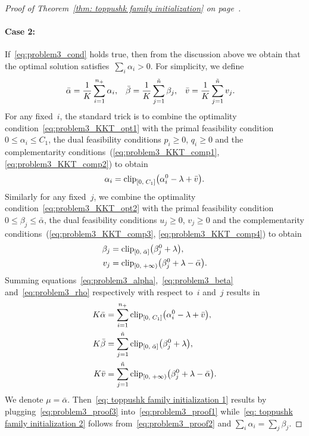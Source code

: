 \begin{proof}[Proof of Theorem~\ref{thm: toppushk family initialization} on page~\pageref{thm: toppushk family initialization}]
  \paragraph*{Case 2:} If~\eqref{eq:problem3_cond} holds true, then from the discussion above we obtain that the optimal solution satisfies~$\sum_i \alpha_i > 0$. For simplicity, we define
  \begin{align*}
    \bar{\alpha} & = \frac{1}{K} \sum_{i=1}^{n_{+}} \alpha_i, &
    \bar{\beta} & = \frac{1}{K} \sum_{j=1}^{\tilde{n}} \beta_j, &
    \bar{v} & = \frac{1}{K} \sum_{j=1}^{\tilde{n}} v_j.
  \end{align*}
  For any fixed~$i$, the standard trick is to combine the optimality condition~\eqref{eq:problem3_KKT_opt1} with the primal feasibility condition~$0 \le \alpha_i \le C_1$, the dual feasibility conditions $p_i \ge 0$, $q_i \ge 0$ and the complementarity conditions~(\ref{eq:problem3_KKT_comp1}, \ref{eq:problem3_KKT_comp2}) to obtain
  \begin{equation}\label{eq:problem3_alpha}
    \alpha_i = \clip{0}{C_1}{\alpha_i^0 - \lambda + \bar{v}}.
  \end{equation}
  Similarly for any fixed~$j$, we combine the optimality condition~\eqref{eq:problem3_KKT_opt2} with the primal feasibility condition~$0 \le \beta_j \le \bar{\alpha}$, the dual feasibility conditions $u_j \ge 0$, $v_j \ge 0$ and the complementarity conditions~(\ref{eq:problem3_KKT_comp3}, \ref{eq:problem3_KKT_comp4}) to obtain
  \begin{align}
    \beta_j
      & = \clip{0}{\bar{\alpha}}{\beta_j^0 + \lambda}, \label{eq:problem3_beta} \\
    v_j
      & = \clip[u]{0}{+\infty}{\beta_j^0 + \lambda - \bar{\alpha}}. \label{eq:problem3_rho}
  \end{align}
  Summing equations~\eqref{eq:problem3_alpha},~\eqref{eq:problem3_beta} and~\eqref{eq:problem3_rho} respectively with respect to~$i$ and~$j$ results in
  \begin{subequations}
    \begin{align}
      K \bar{\alpha}
        & = \sum_{i=1}^{\npos}\clip{0}{C_1}{\alpha_i^0 - \lambda + \bar{v}},
        \label{eq:problem3_proof1} \\
      K \bar{\beta}
        &= \sum_{j=1}^{\ntil} \clip{0}{\bar{\alpha}}{\beta_j^0 + \lambda},
        \label{eq:problem3_proof2} \\
      K \bar{v}
        & = \sum_{j=1}^{\ntil} \clip[u]{0}{+\infty}{\beta_j^0 + \lambda - \bar{\alpha}}.
        \label{eq:problem3_proof3}
    \end{align}
  \end{subequations}
  We denote $\mu = \bar{\alpha}$. Then~\eqref{eq: toppushk family initialization 1} results by plugging~\eqref{eq:problem3_proof3} into~\eqref{eq:problem3_proof1} while~\eqref{eq: toppushk family initialization 2} follows from~\eqref{eq:problem3_proof2} and $\sum_i \alpha_i = \sum_j \beta_j$. 
\end{proof}

